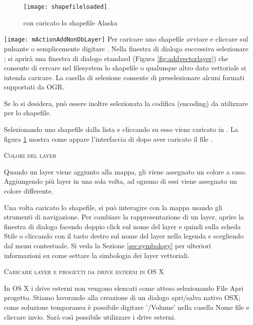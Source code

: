 \begin{figure}[ht]
   \centering
   \texttt{[image: shapefileloaded]}
   \caption{\qg con caricato lo shapefile Alaska \wincaption}\label{fig:loadedshapefile}
\end{figure}

\texttt{[image: mActionAddNonDbLayer]} 
Per caricare uno shapefile avviare \qg e cliccare sul pulsante
 o semplicemente digitare .
Nella finestra di dialogo successiva selezionare ; si aprirà 
una finestra di dialogo standard (Figura \ref{fig:addvectorlayer}) che 
consente di cercare nel filesystem lo shapefile o qualunque altro dato vettoriale 
si intenda caricare. 
La casella di selezione  consente di
preselezionare alcuni formati supportati da OGR.

Se lo si desidera, può essere inoltre selezionata la codifica (encoding) da utilizzare
per lo shapefile.

Selezionando uno shapefile dalla lista e cliccando su  esso viene
caricato in \qg. La figura \ref{fig:loadedshapefile} mostra come appare
l'interfaccia di \qgis dopo aver caricato il file .

\begin{Tip}\caption{\textsc{Colori del layer}}
Quando un layer viene aggiunto alla mappa, gli viene assegnato un
colore a caso. Aggiungendo più layer in una sola volta, ad ognuno di essi
viene assegnato un colore differente.
\end{Tip}

Una volta caricato lo shapefile, si può interagire con la mappa usando 
gli strumenti di navigazione.
Per cambiare la rappresentazione di un layer, aprire la finestra di dialogo
 facendo doppio click sul nome del layer e quindi sulla
scheda Stile o cliccando con il tasto destro sul nome del layer nella legenda 
e scegliendo  dal menu contestuale. Si veda la Sezione
\ref{sec:symbology} per ulteriori informazioni su come settare la simbologia
dei layer vettoriali.

\begin{Tip}\caption{\textsc{Caricare layer e progetti da drive esterni in OS X}}
In OS X i drive esterni non vengono elencati come atteso selezionando File 
\arrow Apri progetto. Stiamo lavorando alla creazione di un dialogo apri/salva 
nativo OSX; come soluzione temporanea è possibile digitare '/Volume' nella 
casella Nome file e cliccare invio. Sarà così possibile utilizzare i drive esterni.
\end{Tip}


